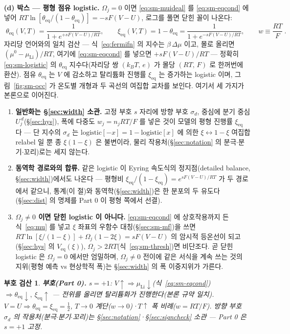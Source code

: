 \documentclass[11pt,a4paper]{article}
\newtheorem*{signbox}{부호 검산}
\newcommand{\eq}{\mathrm{eq}}
\begin{document}
\textbf{(d) 박스 --- 평형 점유 logistic.} $\Omega_j=0$ 이면 \eqref{eq:sm-muideal} 를 \eqref{eq:sm-eqcond} 에
넣어 $RT\ln[\theta_\eq/(1-\theta_\eq)]=-sF(V-U)$, 로그를 풀면 닫힌 꼴이 나온다:
\begin{equation}
\boxed{\;\theta_\eq(V,T)=\frac{1}{1+e^{+sF(V-U)/RT}},\qquad
\xi_\eq(V,T)=1-\theta_\eq=\frac{1}{1+e^{-sF(V-U)/RT}},\qquad
w\equiv\frac{RT}{F}\;.}
\label{eq:sm-logistic}
\end{equation}
자리당 언어와의 일치 검산 --- 식~\eqref{eq:fermifn} 의 지수는 $\beta\,\Delta\mu$ 이고, 몰로 올리면
$(\mu^0-\mu_\mathrm{Li})/RT$, 여기에 \eqref{eq:sm-eqcond} 를 넣으면 $+sF(V-U)/RT$ --- 정확히
\eqref{eq:sm-logistic} 의 $\theta_\eq$ 지수다(자리당 쌍 $(k_BT,\,e)$ 가 몰당 $(RT,\,F)$ 로 한꺼번에 환산).
점유 $\theta_\eq$ 는 $V$ 에 감소하고 탈리튬화 진행률 $\xi_\eq$ 는 증가하는 logistic 이며,
그림~\ref{fig:sm-occ} 가 온도별 개형과 두 곡선의 여집합 교차를 보인다. 여기서 세 가지가 본론으로 이어진다.
\begin{enumerate}[label=(\roman*),leftmargin=2.2em,itemsep=1pt]
\item \textbf{일반화는 \S\ref{sec:width} 소관.} 고정 부호 $s$ 자리에 방향 부호 $\sigma_d$, 중심에 분기 중심
$U_j^{\,d}$(\S\ref{sec:hys}), 폭에 다중도 $w_j=n_jRT/F$ 를 넣은 것이 모델의 평형 진행률 $\xi_\eq$ 다 --- 단 지수의
$\sigma_d$ 는 $\mathrm{logistic}[-x]=1-\mathrm{logistic}[x]$ 에 의한 $\xi\leftrightarrow1-\xi$ 여집합
relabel 일 뿐 종 $\xi(1-\xi)$ 은 불변이라, 물리 작용처(\S\ref{sec:notation} 의 분극$\cdot$분기$\cdot$꼬리)로는
세지 않는다.
\item \textbf{동역학 경로와의 합류.} 같은 logistic 이 Eyring 속도식의 정지점(detailed balance,
\S\ref{sec:width})에서도 나온다 --- 평형비 $\xi_\eq/(1-\xi_\eq)=e^{sF(V-U)/RT}$ 가 두 경로에서 같으니,
통계(이 절)와 동역학(\S\ref{sec:width})은 한 분포의 두 유도다(\S\ref{sec:dist} 의 명제를 Part 0 이 평형
쪽에서 선결).
\item \textbf{$\Omega_j\ne0$ 이면 닫힌 logistic 이 아니다.} \eqref{eq:sm-eqcond} 에 상호작용까지 든
식~\eqref{eq:mu} 를 넣고 $\xi$ 좌표의 우함수 대칭(\S\ref{sec:sm-mf})을 쓰면
$RT\ln[\xi/(1-\xi)]+\Omega_j(1-2\xi)=sF(V-U)$ 의 암시적 등온선이 되고(\S\ref{sec:hys} 의 $V_\eq(\xi)$),
$\Omega_j>2RT$(식~\eqref{eq:sm-thresh})면 비단조다. 곧 닫힌 logistic 은 $\Omega_j=0$ 에서만 엄밀하며,
$\Omega_j\ne0$ 전이에 같은 서식을 계속 쓰는 것의 지위(평형 예측 vs 현상학적 폭)는 \S\ref{sec:width} 의
폭 이중지위가 가른다.
\end{enumerate}

\begin{signbox}
\textbf{부호(Part 0).} $s=+1$: $V\!\uparrow\Rightarrow\mu_\mathrm{Li}\!\downarrow$(식~\eqref{eq:sm-eqcond})
$\Rightarrow\theta_\eq\!\downarrow,\ \xi_\eq\!\uparrow$ --- 전위를 올리면 탈리튬화가 진행한다(본론 규약 일치).
$V=U\Rightarrow\theta_\eq=\xi_\eq=\tfrac12$, $T\to0$ 계단($w\to0$)·$T\!\uparrow$ 폭 비례($w=RT/F$).
방향 부호 $\sigma_d$ 의 작용처(분극$\cdot$분기$\cdot$꼬리)는 \S\ref{sec:notation}·\S\ref{sec:signcheck} 소관 --- Part 0 은 $s=+1$ 고정.
\end{signbox}
\end{document}
